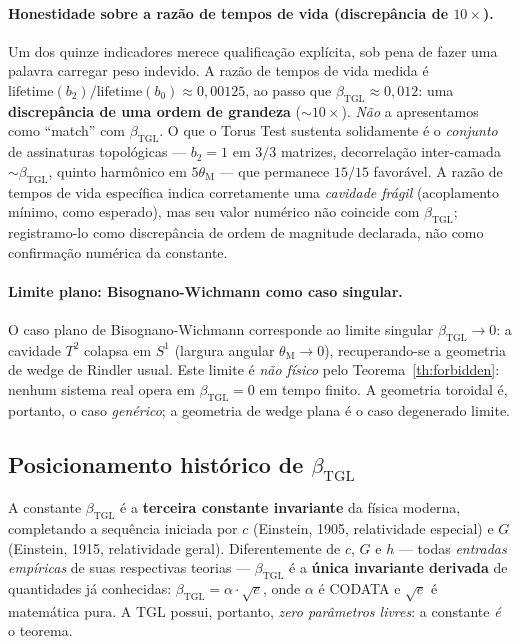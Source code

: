 \documentclass[12pt,a4paper]{article}
\newcommand{\betatgl}{\beta_{\text{TGL}}}
\newcommand{\thetaM}{\theta_{\text{M}}}
\newcommand{\TGL}{\textsc{TGL}}
\begin{document}
\paragraph{Honestidade sobre a razão de tempos de vida (discrepância de $10\times$).}
Um dos quinze indicadores merece qualificação explícita, sob pena de fazer uma
palavra carregar peso indevido.  A razão de tempos de vida medida é
$\text{lifetime}(b_{2})/\text{lifetime}(b_{0}) \approx 0{,}00125$, ao passo que
$\betatgl \approx 0{,}012$: uma \textbf{discrepância de uma ordem de grandeza}
($\sim 10\times$).  \emph{Não} a apresentamos como ``match'' com $\betatgl$.  O
que o Torus Test sustenta solidamente é o \emph{conjunto} de assinaturas
topológicas --- $b_{2}=1$ em $3/3$ matrizes, decorrelação inter-camada
$\sim \betatgl$, quinto harmônico em $5\thetaM$ --- que permanece $15/15$
favorável.  A razão de tempos de vida específica indica corretamente uma
\emph{cavidade frágil} (acoplamento mínimo, como esperado), mas seu valor
numérico não coincide com $\betatgl$; registramo-lo como discrepância de ordem
de magnitude declarada, não como confirmação numérica da constante.

\paragraph{Limite plano: Bisognano-Wichmann como caso singular.}
O caso plano de Bisognano-Wichmann corresponde ao limite singular
$\betatgl \to 0$: a cavidade $T^{2}$ colapsa em $S^{1}$ (largura angular
$\thetaM \to 0$), recuperando-se a geometria de wedge de Rindler usual.
Este limite é \emph{não físico} pelo Teorema~\ref{th:forbidden}: nenhum
sistema real opera em $\betatgl = 0$ em tempo finito.  A geometria
toroidal é, portanto, o caso \emph{genérico}; a geometria de wedge plana
é o caso degenerado limite.

\subsection{Posicionamento histórico de $\betatgl$}
\label{sec:radical-historical}
\label{sec:beta-posicionamento}

A constante $\betatgl$ é a \textbf{terceira constante invariante} da
física moderna, completando a sequência iniciada por $c$ (Einstein, 1905,
relatividade especial) e $G$ (Einstein, 1915, relatividade geral).
Diferentemente de $c$, $G$ e $h$ --- todas \emph{entradas empíricas} de
suas respectivas teorias --- $\betatgl$ é a \textbf{única invariante
derivada} de quantidades já conhecidas: $\betatgl = \alpha \cdot \sqrt{e}$,
onde $\alpha$ é CODATA e $\sqrt{e}$ é matemática pura.  A \TGL{} possui,
portanto, \emph{zero parâmetros livres}: a constante \emph{é} o teorema.
\end{document}
